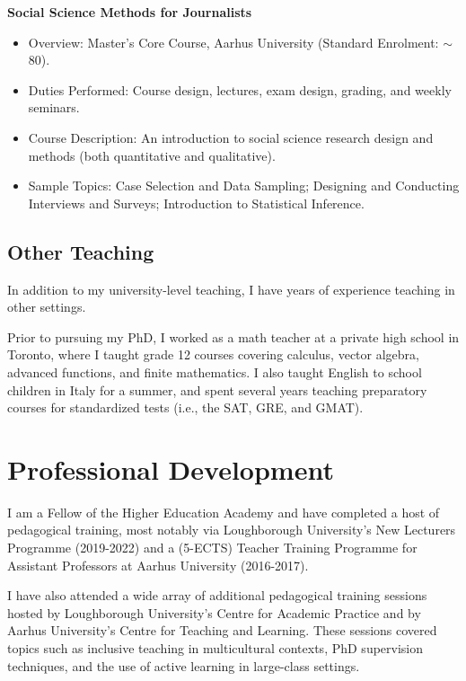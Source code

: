 \documentclass[11pt]{article}
\begin{document}
		  \textbf{Social Science Methods for Journalists}
	      \begin{itemize}[itemsep=0em, topsep=0em, partopsep=0em]
	      	\kern-\parskip\item Overview: Master’s Core Course, Aarhus University (Standard Enrolment: $\sim$ 80).
	      	\item Duties Performed: Course design, lectures, exam design, grading, and weekly seminars.
	      	\item Course Description: An introduction to social science research design and methods (both quantitative and qualitative).
	      	\item Sample Topics: Case Selection and Data Sampling; Designing and Conducting Interviews and Surveys; Introduction to Statistical Inference.
	      \end{itemize}

\subsection{Other Teaching}
In addition to my university-level teaching, I have years of experience teaching in other settings. 

Prior to pursuing my PhD, I worked as a math teacher at a private high school in Toronto, where I taught grade 12 courses covering calculus, vector algebra, advanced functions, and finite mathematics. I also taught English to school children in Italy for a summer, and spent several years teaching preparatory courses for standardized tests (i.e., the SAT, GRE, and GMAT).

\section{ Professional Development}

I am a Fellow of the Higher Education Academy and have completed a host of pedagogical training, most notably via Loughborough University's New Lecturers Programme (2019-2022) and a (5-ECTS) Teacher Training Programme for Assistant Professors at Aarhus University (2016-2017). 
	 
I have also attended a wide array of additional pedagogical training sessions hosted by Loughborough University's Centre for Academic Practice and by Aarhus University's Centre for Teaching and Learning. These sessions covered topics such as inclusive teaching in multicultural contexts, PhD supervision techniques, and the use of active learning in large-class settings.
		
\end{document}
